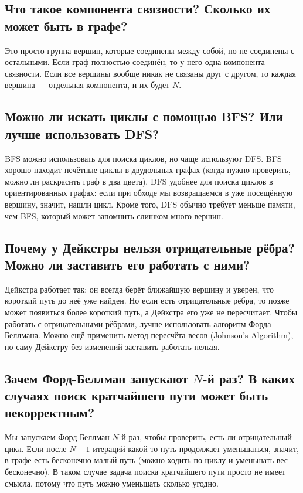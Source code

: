\documentclass{article}
\begin{document}
\subsection*{Что такое компонента связности? Сколько их может быть в графе?}
Это просто группа вершин, которые соединены между собой, но не соединены с остальными.
Если граф полностью соединён, то у него одна компонента связности.
Если все вершины вообще никак не связаны друг с другом, то каждая вершина — отдельная компонента, и их будет $N$.

\subsection*{Можно ли искать циклы с помощью BFS? Или лучше использовать DFS?}
BFS можно использовать для поиска циклов, но чаще используют DFS.
BFS хорошо находит нечётные циклы в двудольных графах (когда нужно проверить, можно ли раскрасить граф в два цвета).
DFS удобнее для поиска циклов в ориентированных графах: если при обходе мы возвращаемся в уже посещённую вершину, значит, нашли цикл.
Кроме того, DFS обычно требует меньше памяти, чем BFS, который может запомнить слишком много вершин.

\subsection*{Почему у Дейкстры нельзя отрицательные рёбра? Можно ли заставить его работать с ними?}
Дейкстра работает так: он всегда берёт ближайшую вершину и уверен, что короткий путь до неё уже найден. Но если есть отрицательные рёбра, то позже может появиться более короткий путь, а Дейкстра его уже не пересчитает.
Чтобы работать с отрицательными рёбрами, лучше использовать алгоритм Форда-Беллмана. Можно ещё применить метод пересчёта весов (Johnson’s Algorithm), но саму Дейкстру без изменений заставить работать нельзя.

\subsection*{Зачем Форд-Беллман запускают $N$-й раз? В каких случаях поиск кратчайшего пути может быть некорректным?}
Мы запускаем Форд-Беллман $N$-й раз, чтобы проверить, есть ли отрицательный цикл. Если после $N-1$ итераций какой-то путь продолжает уменьшаться, значит, в графе есть бесконечно малый путь (можно ходить по циклу и уменьшать вес бесконечно).
В таком случае задача поиска кратчайшего пути просто не имеет смысла, потому что путь можно уменьшать сколько угодно.
\end{document}

